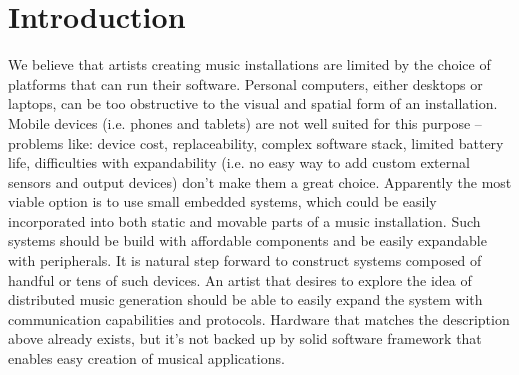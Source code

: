 \documentclass{article}
\title{\papertitle}
\begin{document}
\capstartfalse %
\maketitle %
\capstarttrue %

\begin{abstract}
Application of embedded systems to music installations is limited due to the
absence of convenient software development tools.  This is a very unfortunate
situation as these systems offer an array of advantages over desktop or laptop
computers.  Small size of embedded systems is a factor that makes them
especially suitable for incorporation into various forms of art.  These devices
are effortlessly expandable with various sensors and can produce rich
audio-visual effects.  Their low price makes it affordable to build and
experiment with networks of cooperating devices that generate music.

In this paper we describe the design of Komeda -- implementation platform for
interactive algorithmic music tailored for embedded systems.  Our framework
consists of music description language, intermediate binary representation and
portable virtual machine with user defined extensions (called modules).
\end{abstract}

\section{Introduction}
\label{sec:introduction}
We believe that artists creating music installations are limited by the choice
of platforms that can run their software.  Personal computers, either desktops
or laptops, can be too obstructive to the visual and spatial form of an
installation.  Mobile devices (i.e. phones and tablets) are not well suited for
this purpose -- problems like: device cost, replaceability, complex software
stack, limited battery life, difficulties with expandability (i.e. no easy way
to add custom external sensors and output devices) don't make them a great
choice.  Apparently the most viable option is to use small embedded systems,
which could be easily incorporated into both static and movable parts of a
music installation.  Such systems should be build with affordable components
and be easily expandable with peripherals.  It is natural step forward to
construct systems composed of handful or tens of such devices.  An artist that
desires to explore the idea of distributed music generation should be able to
easily expand the system with communication capabilities and protocols.
Hardware that matches the description above already exists, but it's not backed
up by solid software framework that enables easy creation of musical
applications.
\end{document}
